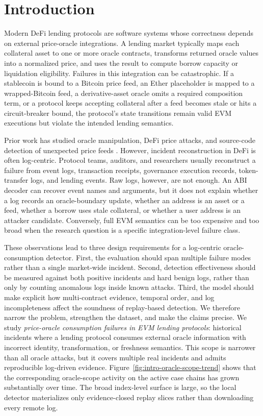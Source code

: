 \documentclass[final,5p]{elsarticle}
\begin{document}
\section{Introduction}

Modern DeFi lending protocols are software systems whose correctness depends on external price-oracle integrations.
A lending market typically maps each collateral asset to one or more oracle contracts, transforms returned oracle values into a normalized price, and uses the result to compute borrow capacity or liquidation eligibility.
Failures in this integration can be catastrophic.
If a stablecoin is bound to a Bitcoin price feed, an Ether placeholder is mapped to a wrapped-Bitcoin feed, a derivative-asset oracle omits a required composition term, or a protocol keeps accepting collateral after a feed becomes stale or hits a circuit-breaker bound, the protocol's state transitions remain valid EVM executions but violate the intended lending semantics.

Prior work has studied oracle manipulation, DeFi price attacks, and source-code detection of unexpected price feeds \cite{mo2023toward,wu2021defiranger,liu2021first,kaleem2021demystifying}.
However, incident reconstruction in DeFi is often log-centric.
Protocol teams, auditors, and researchers usually reconstruct a failure from event logs, transaction receipts, governance execution records, token-transfer logs, and lending events.
Raw logs, however, are not enough.
An ABI decoder can recover event names and arguments, but it does not explain whether a log records an oracle-boundary update, whether an address is an asset or a feed, whether a borrow uses stale collateral, or whether a user address is an attacker candidate.
Conversely, full EVM semantics can be too expensive and too broad when the research question is a specific integration-level failure class.

These observations lead to three design requirements for a log-centric oracle-consumption detector.
First, the evaluation should span multiple failure modes rather than a single market-wide incident.
Second, detection effectiveness should be measured against both positive incidents and hard benign logs, rather than only by counting anomalous logs inside known attacks.
Third, the model should make explicit how multi-contract evidence, temporal order, and log incompleteness affect the soundness of replay-based detection.
We therefore narrow the problem, strengthen the dataset, and make the claims precise.
We study \emph{price-oracle consumption failures in EVM lending protocols}: historical incidents where a lending protocol consumes external oracle information with incorrect identity, transformation, or freshness semantics.
This scope is narrower than all oracle attacks, but it covers multiple real incidents and admits reproducible log-driven evidence.
Figure~\ref{fig:intro-oracle-scope-trend} shows that the corresponding oracle-scope activity on the active case chains has grown substantially over time.
The broad index-level surface is large, so the local detector materializes only evidence-closed replay slices rather than downloading every remote log.
\end{document}
